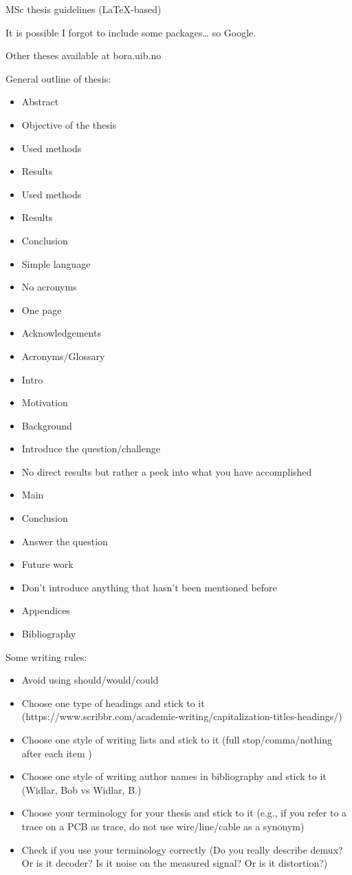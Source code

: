 MSc thesis guidelines (LaTeX-based) 

It is possible I forgot to include some packages… so Google.

Other theses available at bora.uib.no 

General outline of thesis:  
\begin{itemize}
    \item Abstract  
        \item Objective of the thesis 
        \item Used methods
        \item Results
        \item Used methods
        \item Results
        \item Conclusion
        \item Simple language
        \item No acronyms
        \item One page
    \item Acknowledgements
    \item Acronyms/Glossary
    \item Intro
    	\item Motivation
    	\item Background
    	\item Introduce the question/challenge
    	\item No direct results but rather a peek into what you have accomplished 
    \item Main
    \item Conclusion
    	\item Answer the question
    	\item Future work
    	\item Don't introduce anything that hasn't been mentioned before
    \item Appendices
    \item Bibliography
\end{itemize}

Some writing rules: 
\begin{itemize}
	\item Avoid using should/would/could 
	\item Choose one type of headings and stick to it (https://www.scribbr.com/academic-writing/capitalization-titles-headings/) 
	\item Choose one style of writing lists and stick to it (full stop/comma/nothing after each item )
	\item Choose one style of writing author names in bibliography and stick to it (Widlar, Bob vs Widlar, B.) 
	\item Choose your terminology for your thesis and stick to it (e.g., if you refer to a trace on a PCB as trace, do not use wire/line/cable as a synonym) 
	\item Check if you use your terminology correctly (Do you really describe demux? Or is it decoder? Is it noise on the measured signal? Or is it distortion?)  
\end{itemize}

